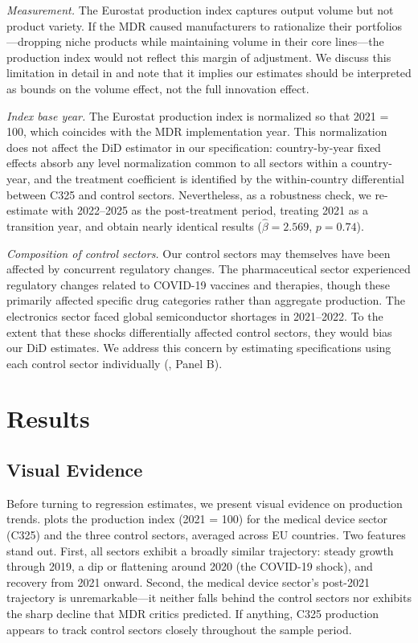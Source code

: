 \documentclass[12pt]{article}
\begin{document}
\textit{Measurement.} The Eurostat production index captures output volume but not product variety. If the MDR caused manufacturers to rationalize their portfolios---dropping niche products while maintaining volume in their core lines---the production index would not reflect this margin of adjustment. We discuss this limitation in detail in  and note that it implies our estimates should be interpreted as bounds on the volume effect, not the full innovation effect.

\textit{Index base year.} The Eurostat production index is normalized so that 2021 = 100, which coincides with the MDR implementation year. This normalization does not affect the DiD estimator in our specification: country-by-year fixed effects absorb any level normalization common to all sectors within a country-year, and the treatment coefficient is identified by the within-country differential between C325 and control sectors. Nevertheless, as a robustness check, we re-estimate with 2022--2025 as the post-treatment period, treating 2021 as a transition year, and obtain nearly identical results ($\hat{\beta} = 2.569$, $p = 0.74$).

\textit{Composition of control sectors.} Our control sectors may themselves have been affected by concurrent regulatory changes. The pharmaceutical sector experienced regulatory changes related to COVID-19 vaccines and therapies, though these primarily affected specific drug categories rather than aggregate production. The electronics sector faced global semiconductor shortages in 2021--2022. To the extent that these shocks differentially affected control sectors, they would bias our DiD estimates. We address this concern by estimating specifications using each control sector individually (, Panel B).



\section{Results}
\label{sec:results}

\subsection{Visual Evidence}

Before turning to regression estimates, we present visual evidence on production trends.  plots the production index (2021 = 100) for the medical device sector (C325) and the three control sectors, averaged across EU countries. Two features stand out. First, all sectors exhibit a broadly similar trajectory: steady growth through 2019, a dip or flattening around 2020 (the COVID-19 shock), and recovery from 2021 onward. Second, the medical device sector's post-2021 trajectory is unremarkable---it neither falls behind the control sectors nor exhibits the sharp decline that MDR critics predicted. If anything, C325 production appears to track control sectors closely throughout the sample period.
\end{document}

